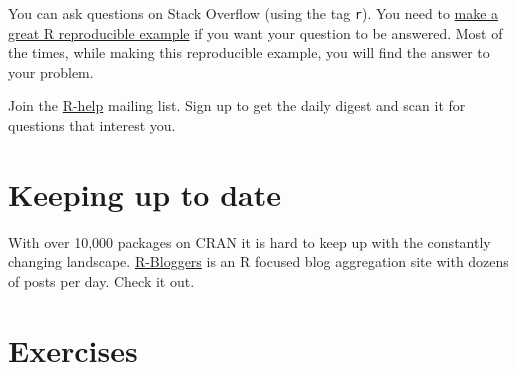 \documentclass[]{book}
\theoremstyle{definition}
\theoremstyle{definition}
\theoremstyle{definition}
\theoremstyle{remark}
\begin{document}
You can ask questions on Stack Overflow (using the tag \texttt{r}). You
need to
\href{https://stackoverflow.com/questions/5963269/how-to-make-a-great-r-reproducible-example}{make
a great R reproducible example} if you want your question to be
answered. Most of the times, while making this reproducible example, you
will find the answer to your problem.

Join the \href{https://www.r-project.org/mail.html}{R-help} mailing
list. Sign up to get the daily digest and scan it for questions that
interest you.

\hypertarget{keeping-up-to-date}{%
\section{Keeping up to date}\label{keeping-up-to-date}}

With over 10,000 packages on CRAN it is hard to keep up with the
constantly changing landscape.
\href{https://www.r-bloggers.com/}{R-Bloggers} is an R focused blog
aggregation site with dozens of posts per day. Check it out.

\hypertarget{exercises}{%
\section{Exercises}\label{exercises}}
\end{document}
